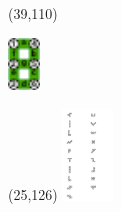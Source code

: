 \documentclass{extarticle}
\begin{document}
\begin{textblock}{0}(39,110)
\vfill
{\centerline{\includegraphics[height=14mm]{tools/images/segment-numbering.pdf}}} 
\vfill
\end{textblock}

\begin{textblock}{0}(25,126)%
\vfill
{\includegraphics[width=13.5mm]{tools/xmino-v2.pdf}}
\vfill
\end{textblock}
\end{document}
